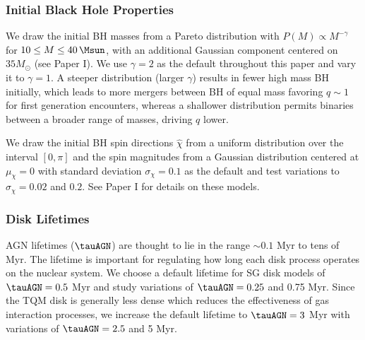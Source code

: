 \subsubsection{Initial Black Hole Properties}
We draw the initial BH masses from a Pareto distribution with $P(M) \propto M^{-\gamma}$ for $10\leq M \leq40\,\Msun$, with an additional Gaussian component centered on $35M_{\odot}$ (see Paper I).
We use $\gamma=2$ as the default throughout this paper and vary it to $\gamma=1$.
A steeper distribution (larger $\gamma$) results in fewer high mass BH initially, which leads to more mergers between BH of equal mass favoring $q\sim1$ for first generation encounters, whereas a shallower distribution permits binaries between a broader range of masses, driving $q$ lower.

We draw the initial BH spin directions $\hat{\chi}$ from a uniform distribution over the interval $[0,\pi]$ and the spin magnitudes from a Gaussian distribution centered at $\mu_\chi=0$ with standard deviation $\sigma_{\chi} = 0.1$ as the default and test variations to $\sigma_{\chi}=0.02$ and $0.2$.
See Paper I for details on these models.

\subsubsection{Disk Lifetimes}
AGN lifetimes ($\tauAGN$) are thought to lie in the range $\sim 0.1$ Myr to tens of Myr.
The lifetime is important for regulating how long each disk process operates on the nuclear system.
We choose a default lifetime for SG disk models of $\tauAGN=0.5$ Myr and study variations of $\tauAGN = 0.25$ and 0.75 Myr.
Since the TQM disk is generally less dense which reduces the effectiveness of gas interaction processes, we increase the default lifetime to $\tauAGN = 3$ Myr with variations of $\tauAGN = 2.5$ and 5 Myr.

